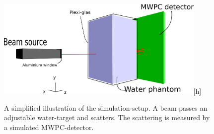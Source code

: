 \begin{figure}[ht] 
\begin{center}
\includegraphics[width=0.9\textwidth]{images/SimSetup.png}[h]  
\caption{\label{fig:SimSetupIncscape} A simplified illustration of the simulation-setup. A beam passes an adjustable water-target and scatters. The scattering is measured by a simulated MWPC-detector.}
 \end{center}
 \end{figure}



